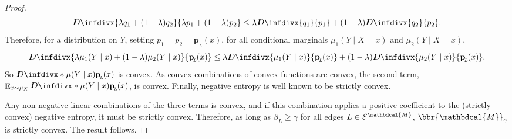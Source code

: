 \documentclass[letterpaper]{article} %
\theoremstyle{plain}
\theoremstyle{definition}
\theoremstyle{remark}
\DeclareMathOperator*{\Ex}{\mathbb{E}} %
\newcommand\mat[1]{\mathbf{#1}}
\newcommand{\thickD}{I\mkern-8muD}
\newcommand{\kldiv}{\thickD\infdivx}
\newcommand{\bp}[1][L]{\mat{p}_{\!_{#1}\!}}
\newcommand{\Ed}{\mathcal E}
\newcommand{\dg}[1]{\mathbdcal{#1}}
\begin{document}
\begin{proof}
	\[ \kldiv{\lambda q_1 + (1-\lambda) q_2 }{ \lambda p_1 +
          (1-\lambda) p_2} \leq \lambda \kldiv {q_1}{ p_1} +
                (1-\lambda) \kldiv{q_2}{p_2}. \] 
	Therefore, for a distribution on $Y$, setting $p_1 =
 p_2 = \bp(x)$, for all conditional marginals $\mu_1(Y \mid X=x)$ and
			$\mu_2(Y\mid X=x)$,
	\[ \kldiv{\lambda \mu_1(Y\mid x) + (1-\lambda)
			  \mu_2(Y\mid x) }{ \bp(x) } \leq \lambda \kldiv
			   {\mu_1(Y\mid x)}{\bp(x)} + (1-\lambda)
								  \kldiv{\mu_2(Y\mid x)}{\bp(x)}. \] 
	So $\kldiv*{\mu(Y\mid x)}{\bp( x)}$ is convex. As
			convex combinations of convex functions are convex,
			the second term, $\Ex_{x\sim\mu_X}\kldiv*{\mu(Y\mid
			  x)}{\bp( x)}$, is convex.
Finally, negative entropy is well known to be strictly convex.                

			Any non-negative linear combinations of the three
			terms is convex, and if this combination applies a
			positive coefficient to the (strictly convex) negative entropy,
			it must be strictly convex. Therefore, as
			long as $\beta_L \geq \gamma$ for all edges $L \in
			\Ed^{\dg M}$, $\bbr{\dg M}_\gamma$ is
strictly convex.  The result follows.
\end{proof}
\end{document}
